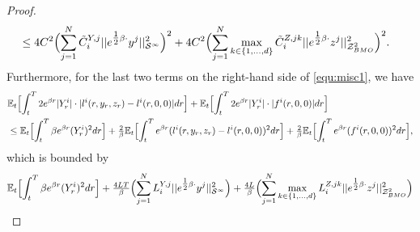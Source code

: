 \documentclass[10pt,a4paper]{article}
\DeclareMathOperator*{\esssup}{ess\,sup}
\theoremstyle{plain}
\theoremstyle{definition}
\numberwithin{equation}{section}
\begin{document}
\begin{proof}
\begin{align}
&\leq 4C^{2}\Bigl(\sum_{j=1}^{N}\tilde{C}_{i}^{Y,j}||e^{\tfrac{1}{2}\beta\cdot}y^{j}||_{\mathcal{S}^{\infty}}^{2}\Bigr)^{2} + 4C^{2}\Bigl(\sum_{j=1}^{N}\max_{k \in \{1,...,d\}}\tilde{C}_{i}^{Z,jk}||e^{\tfrac{1}{2}\beta \cdot}z^{j}||_{\mathcal{Z}_{BMO}^{2}}^{2}\Bigr)^{2}. \label{equ:misc3}
\end{align}
Furthermore, for the last two terms on the right-hand side of \eqref{equ:misc1}, we have
\begin{align}
&\mathbb{E}_{t}\Bigl[\int_{t}^{T}2e^{\beta r}|Y_{r}^{i}|\cdot|l^{i}(r,y_{r},z_{r})-l^{i}(r,0,0)|dr\Bigr] + \mathbb{E}_{t}\Bigl[\int_{t}^{T}2e^{\beta r}|Y_{r}^{i}|\cdot |f^{i}(r,0,0)|dr\Bigr] \nonumber \\
&\leq \mathbb{E}_{t}\Bigl[\int_{t}^{T}\beta e^{\beta r}(Y_{r}^{i})^{2}dr\Bigr] + \tfrac{2}{\beta}\mathbb{E}_{t}\Bigl[\int_{t}^{T}e^{\beta r}(l^{i}(r,y_{r},z_{r})-l^{i}(r,0,0))^{2}dr\Bigr] + \tfrac{2}{\beta}\mathbb{E}_{t}\Bigl[\int_{t}^{T}e^{\beta r}(f^{i}(r,0,0))^{2}dr\Bigr], \nonumber
\end{align}
which is bounded by
\begin{align}
&\mathbb{E}_{t}\Bigl[\int_{t}^{T}\beta e^{\beta r}(Y_{r}^{i})^{2}dr\Bigr] + \tfrac{4LT}{\beta}\Bigl(\sum_{j=1}^{N}L_{i}^{Y,j}||e^{\tfrac{1}{2}\beta\cdot}y^{j}||_{\mathcal{S}^{\infty}}^{2}\Bigr) + \tfrac{4L}{\beta}\Bigl(\sum_{j=1}^{N}\max_{k \in \{1,...,d\}}L_{i}^{Z,jk}||e^{\tfrac{1}{2}\beta \cdot}z^{j}||_{\mathcal{Z}_{BMO}^{2}}^{2}\Bigr) \nonumber \\

\end{align}
\end{proof}
\end{document}
